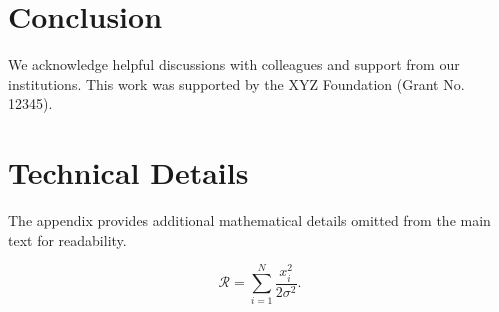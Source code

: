 \documentclass[%
reprint,
amsmath,amssymb,
aps,
floatfix,
]{revtex4-2}
\begin{document}
	\section{Conclusion}
	
	\begin{acknowledgments}
		We acknowledge helpful discussions with colleagues and support from our institutions. This work was supported by the XYZ Foundation (Grant No. 12345).
	\end{acknowledgments}
	
	\appendix
	\section{Technical Details}
	
	The appendix provides additional mathematical details omitted from the main text for readability.
	
	\begin{equation}
		\mathcal{R} = \sum_{i=1}^N \frac{x_i^2}{2\sigma^2}.
		\label{eq:appendix_eq}
	\end{equation}
	
	
	
\end{document}
